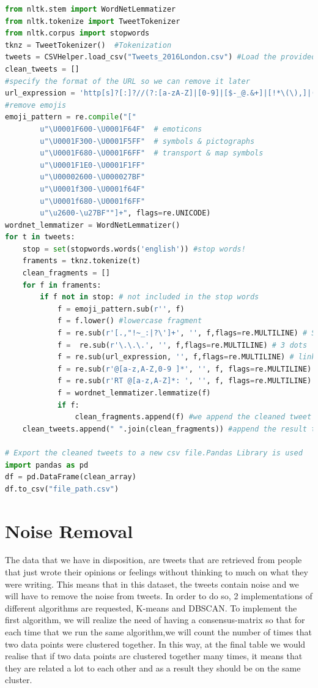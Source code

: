 \documentclass{article}
\begin{document}
         
        \begin{lstlisting}[language=Python, caption= Python Cleaning Function, label={lst:dataCleaning}]
from nltk.stem import WordNetLemmatizer
from nltk.tokenize import TweetTokenizer
from nltk.corpus import stopwords
tknz = TweetTokenizer()  #Tokenization
tweets = CSVHelper.load_csv("Tweets_2016London.csv") #Load the provided CSV file
clean_tweets = [] 
#specify the format of the URL so we can remove it later
url_expression = 'http[s]?[:]?//(?:[a-zA-Z]|[0-9]|[$-_@.&+]|[!*\(\),]|(?:%[0-9a-fA-F][0-9a-fA-F]))+'
#remove emojis
emoji_pattern = re.compile("["
        u"\U0001F600-\U0001F64F"  # emoticons
        u"\U0001F300-\U0001F5FF"  # symbols & pictographs
        u"\U0001F680-\U0001F6FF"  # transport & map symbols
        u"\U0001F1E0-\U0001F1FF" 
        u"\U00002600-\U000027BF"
        u"\U0001f300-\U0001f64F"
        u"\U0001f680-\U0001f6FF"
        u"\u2600-\u27BF""]+", flags=re.UNICODE)
wordnet_lemmatizer = WordNetLemmatizer()
for t in tweets:
    stop = set(stopwords.words('english')) #stop words!
    framents = tknz.tokenize(t)
    clean_fragments = []
    for f in framents:
        if f not in stop: # not included in the stop words
            f = emoji_pattern.sub(r'', f)
            f = f.lower() #lowercase fragment
            f = re.sub(r'[.,"!~_:|?\']+', '', f,flags=re.MULTILINE) # Special characters
            f =  re.sub(r'\.\.\.', '', f,flags=re.MULTILINE) # 3 dots
            f = re.sub(url_expression, '', f,flags=re.MULTILINE) # links
            f = re.sub(r'@[a-z,A-Z,0-9 ]*', '', f, flags=re.MULTILINE) #clean at person references
            f = re.sub(r'RT @[a-z,A-Z]*: ', '', f, flags=re.MULTILINE) #Remove retweets
            f = wordnet_lemmatizer.lemmatize(f)
            if f:
                clean_fragments.append(f) #we append the cleaned tweet to clean_fragment vector
    clean_tweets.append(" ".join(clean_fragments)) #append the result to clean_tweets

# Export the cleaned tweets to a new csv file.Pandas Library is used
import pandas as pd
df = pd.DataFrame(clean_array)
df.to_csv("file_path.csv")
        \end{lstlisting}

        \newpage
        \section{Noise Removal}
The data that we have in disposition, are tweets that are retrieved from people that just wrote their opinions or feelings without thinking to much on what they were writing. This means that in this dataset, the tweets contain noise and we will have to remove the noise from tweets. In order to do so, 2 implementations of different algorithms are requested, K-means and DBSCAN. 
To implement the first algorithm, we will realize the need of having a consensus-matrix so that for each time that we run the same algorithm,we will count the number of times that two data points were clustered together. In this way, at the final table we would realise that if two data points are clustered together many times, it means that they are related a lot to each other and as a result they should be on the same cluster. 
\end{document}
